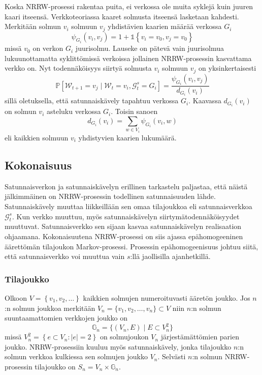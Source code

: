 \documentclass[finnish, 12pt, a4paper, sci, utf8, pdfa]{aaltothesis}
\newcommand{\Grandom}{\mathcal{G}}
\newcommand{\Wrandom}{\mathcal{W}}
\newcommand{\indicator}{\mathopen{\mathds{1}}}
\newcommand*{\prob}{\mathbb{P}}
\begin{document}
Koska NRRW-prosessi rakentaa puita, ei verkossa ole muita syklejä kuin juuren kaari itseensä. Verkkoteoriassa kaaret solmusta itseensä lasketaan kahdesti. Merkitään solmun \( v_{i} \) solmuun \( v_{j} \) yhdistävien kaarien määrää verkossa $ G_{i} $
\[
   \psi_{G_{i}}(v_{i}, v_{j}) = 1 + \indicator \left\{ v_{i} = v_{0}, v_{j} = v_{0} \right\}
   \label{equation:psi}
\]
missä $ v_{0} $ on verkon $ G_{i} $ juurisolmu. Lauseke on pätevä vain juurisolmua lukuunottamatta syklittömissä verkoissa jollainen NRRW-prosessin kasvattama verkko on. Nyt todennäköisyys siirtyä solmusta \( v_{i} \) solmuun \( v_{j} \) on yksinkertaisesti
\begin{equation}
   \prob \left[ \Wrandom_{t+1} = v_{j} \mid \Wrandom_{t} = v_{i}, \Grandom_{t}^{s} = G_{i} \right] = \frac{\psi_{G_{i}}(v_{i}, v_{j})}{d_{G_{i}}(v_{i})}
   \label{equation:verkko-tn}
\end{equation}
sillä oletuksella, että satunnaiskävely tapahtuu verkossa $ G_{i} $. Kaavassa \( d_{G_{i}}(v_{i}) \) on solmun \( v_{i} \) asteluku verkossa $ G_{i} $. Toisin sanoen
\begin{equation}
   d_{G_{i}}(v_{i}) = \sum_{w \in V_{i}} \psi_{G_{i}}(v_{i}, w)
   \label{equation:asteluku}
\end{equation}
eli kaikkien solmuun \( v_{i} \) yhdistyvien kaarien lukumäärä.

\subsection{Kokonaisuus}

Satunnaisverkon ja satunnaiskävelyn erillinen tarkastelu paljastaa, että näistä jälkimmäinen on NRRW-prosessin todellinen satunnaisuuden lähde. Satunnaiskävely muuttaa liikkeillään sen omaa tilajoukkoa eli satunnaisverkkoa \( \Grandom_{t}^{s} \). Kun verkko muuttuu, myös satunnaiskävelyn siirtymätodennäköisyydet muuttuvat. Satunnaisverkko sen sijaan kasvaa satunnaiskävelyn realisaation ohjaamana. Kokonaisuutena NRRW-prosessi on siis ajassa epähomogeeninen äärettömän tilajoukon Markov-prosessi. Prosessin epähomogeenisuus johtuu siitä, että satunnaisverkko voi muuttua vain $ s $:llä jaollisilla ajanhetkillä.

\subsubsection{Tilajoukko}

Olkoon $ V = \left\{ v_{1}, v_{2}, \ldots \right\} $ kaikkien solmujen numeroituvasti ääretön joukko. Jos $ n $:n solmun joukkoa merkitään $ V_{n} = \{ v_{1}, v_{2}, \ldots , v_{n} \} \subset V $ niin $ n $:n solmun suuntaamattomien verkkojen joukko on
\[
   \mathbb{G}_{n} = \{ (V_{n}, E) \mid E \subset V_{n}^{2}  \}
\]
missä $ V_{n}^{2} = \left\{ e \subset V_{n} : |e| = 2 \right\} $ on solmujoukon $ V_{n} $ järjestämättömien parien joukko. NRRW-prosessiin kuuluu myös satunnaiskävely, jonka tilajoukko $ n $:n solmun verkkoa kulkiessa sen solmujen joukko $ V_{n} $. Selvästi $ n $:n solmun NRRW-prosessin tilajoukko on $ S_{n} = V_{n} \times \mathbb{G}_{n} $.
\end{document}
